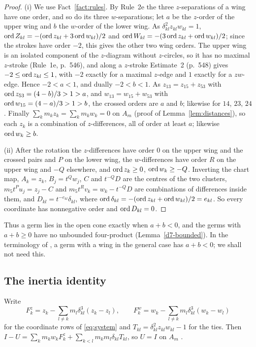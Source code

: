\begin{proof}
(i) We use Fact~\ref{fact:rules}.  By Rule~2e \cite[p.~552]{AK} the three $z$-separations of a
wing have one order, and so do its three $w$-separations; let $a$ be the $z$-order of the upper
wing and $b$ the $w$-order of the lower wing.  As $\delta_{kl}^2z_{kl}w_{kl}=1$,
$\operatorname{ord} Z_{kl}=-(\operatorname{ord} z_{kl}+3\operatorname{ord} w_{kl})/2$ and $\operatorname{ord} W_{kl}=-(3\operatorname{ord} z_{kl}+\operatorname{ord} w_{kl})/2$;
since the strokes have order $-2$, this gives the other two wing orders.  The upper wing is an
isolated component of the $z$-diagram without $z$-circles, so it has no maximal $z$-stroke
(Rule~1e, p.~546), and along a $z$-stroke Estimate~2 (p.~548) gives $-2\le\operatorname{ord} z_{kl}\le1$, with
$-2$ exactly for a maximal $z$-edge and $1$ exactly for a $zw$-edge.  Hence $-2<a<1$, and dually
$-2<b<1$.  As $z_{13}=z_{15}+z_{53}$
with $\operatorname{ord} z_{53}=(4-b)/3>1>a$, and $w_{13}=w_{15}+w_{53}$ with $\operatorname{ord} w_{15}=(4-a)/3>1>b$, the
crossed orders are $a$ and $b$; likewise for $14$, $23$, $24$.  Finally
$\sum_km_kz_k=\sum_km_kw_k=0$ on $A_m$ (proof of Lemma~\ref{lem:distances}), so each $z_k$ is a
combination of $z$-differences, all of order at least $a$; likewise $\operatorname{ord} w_k\ge b$.

(ii) After the rotation the $z$-differences have order $0$ on the upper wing and the crossed
pairs and $P$ on the lower wing, the $w$-differences have order $R$ on the upper wing and $-Q$
elsewhere, and $\operatorname{ord} z_k\ge0$, $\operatorname{ord} w_k\ge-Q$.  Inverting the chart map, $A_k=z_k$,
$B_j=t^Qw_j$, $C$ and $t^{-Q}D$ are the centres of the two clusters, $m_5t^Pu_j=z_j-C$ and
$m_5t^Rv_k=w_k-t^{-Q}D$ are combinations of differences inside them, and
$D_{kl}=t^{-e_{kl}}\delta_{kl}$, where $\operatorname{ord}\delta_{kl}=-(\operatorname{ord} z_{kl}+\operatorname{ord} w_{kl})/2=e_{kl}$.  So
every coordinate has nonnegative order and $\operatorname{ord} D_{kl}=0$.
\end{proof}

Thus a germ lies in the open cone exactly when $a+b<0$, and the germs with $a+b\ge0$ have no
unbounded four-product (Lemma~\ref{d7-bounded}).  In the terminology of \cite[\S8.7]{AK}, a germ
with a wing in the general case has $a+b<0$; we shall not need this.

\subsection{The inertia identity}
Write
\[
  F^z_k=z_k-\sum_{l\ne k}m_l\delta_{kl}^3(z_k-z_l),\qquad
  F^w_k=w_k-\sum_{l\ne k}m_l\delta_{kl}^3(w_k-w_l)
\]
for the coordinate rows of \eqref{eq:system} and $T_{kl}=\delta_{kl}^2z_{kl}w_{kl}-1$ for the
ties.  Then $I-U=\sum_km_kw_kF^z_k+\sum_{k<l}m_km_l\delta_{kl}T_{kl}$, so $U=I$ on $A_m$
\cite[p.~541]{AK}.

